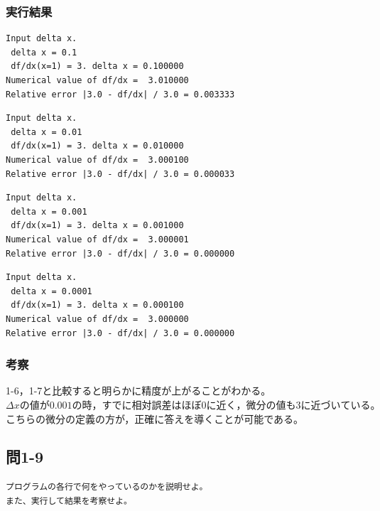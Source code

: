 \documentclass{jarticle}
\begin{document}
\subsubsection{実行結果\\}
\begin{breakbox}
\begin{verbatim}
Input delta x. 
 delta x = 0.1
 df/dx(x=1) = 3. delta x = 0.100000 
Numerical value of df/dx =  3.010000 
Relative error |3.0 - df/dx| / 3.0 = 0.003333 
\end{verbatim}
\end{breakbox}

\begin{breakbox}
\begin{verbatim}
Input delta x. 
 delta x = 0.01
 df/dx(x=1) = 3. delta x = 0.010000 
Numerical value of df/dx =  3.000100 
Relative error |3.0 - df/dx| / 3.0 = 0.000033 
\end{verbatim}
\end{breakbox}

\begin{breakbox}
\begin{verbatim}
Input delta x. 
 delta x = 0.001
 df/dx(x=1) = 3. delta x = 0.001000 
Numerical value of df/dx =  3.000001 
Relative error |3.0 - df/dx| / 3.0 = 0.000000 
\end{verbatim}
\end{breakbox}

\begin{breakbox}
\begin{verbatim}
Input delta x. 
 delta x = 0.0001
 df/dx(x=1) = 3. delta x = 0.000100 
Numerical value of df/dx =  3.000000 
Relative error |3.0 - df/dx| / 3.0 = 0.000000 
\end{verbatim}
\end{breakbox}
\subsubsection{考察\\}
1-6，1-7と比較すると明らかに精度が上がることがわかる。\\
$\Delta xの値が0.001の時，すでに相対誤差はほぼ0に近く，微分の値も3に近づいている。$\\
こちらの微分の定義の方が，正確に答えを導くことが可能である。\\

\subsection{問1-9\\}
\begin{verbatim}
プログラムの各行で何をやっているのかを説明せよ。
また、実行して結果を考察せよ。
\end{verbatim}
\end{document}

